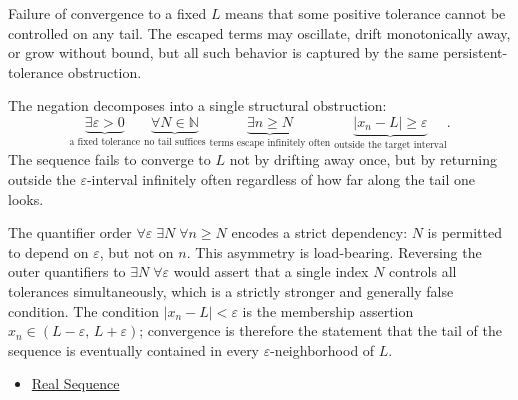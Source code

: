 \begin{remark*}
Failure of convergence to a fixed $L$ means that some positive tolerance
cannot be controlled on any tail. The escaped terms may oscillate, drift
monotonically away, or grow without bound, but all such behavior is
captured by the same persistent-tolerance obstruction.
\end{remark*}

\begin{remark*}
The negation decomposes into a single structural obstruction:
\[
\underbrace{\exists \varepsilon > 0}_{\text{a fixed tolerance}}
\;\underbrace{\forall N \in \mathbb{N}}_{\text{no tail suffices}}
\;\underbrace{\exists n \ge N}_{\text{terms escape infinitely often}}
\;\underbrace{|x_n - L| \ge \varepsilon}_{\text{outside the target interval}}.
\]
The sequence fails to converge to $L$ not by drifting away once, but
by returning outside the $\varepsilon$-interval infinitely often regardless
of how far along the tail one looks.
\end{remark*}

\begin{remark*}[Interpretation]
The quantifier order $\forall \varepsilon \;\exists N \;\forall n \ge N$
encodes a strict dependency: $N$ is permitted to depend on $\varepsilon$,
but not on $n$. This asymmetry is load-bearing. Reversing the outer
quantifiers to $\exists N \;\forall \varepsilon$ would assert that a
single index $N$ controls all tolerances simultaneously, which is a
strictly stronger and generally false condition. The condition
$|x_n - L| < \varepsilon$ is the membership assertion $x_n \in (L -
\varepsilon,\, L + \varepsilon)$; convergence is therefore the statement
that the tail of the sequence is eventually contained in every
$\varepsilon$-neighborhood of $L$.
\end{remark*}

\begin{dependencies}
\begin{itemize}
  \item \hyperref[def:real-sequence]{Real Sequence}
\end{itemize}
\end{dependencies}

